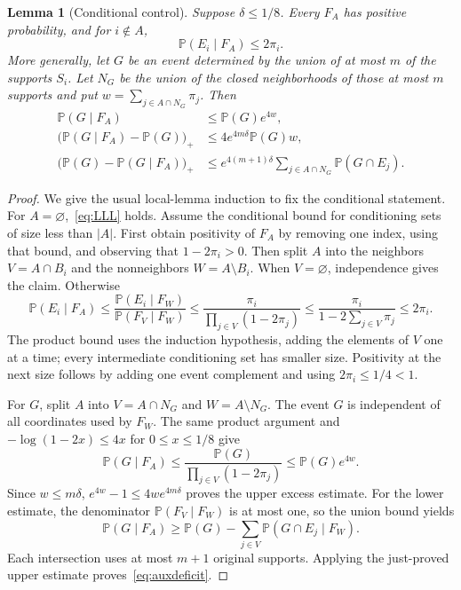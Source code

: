 \documentclass[11pt]{article}
\newtheorem{lemma}[theorem]{Lemma}
\theoremstyle{definition}\newtheorem{definition}[theorem]{Definition}
\theoremstyle{remark}\newtheorem{remark}[theorem]{Remark}
\newcommand{\PP}{\mathbb P}
\begin{document}
\begin{lemma}[Conditional control]\label{lem:conditional}
Suppose $\delta\le1/8$. Every $F_A$ has positive probability, and for
$i\notin A$,
\begin{equation}
 \PP(E_i\mid F_A)\le2\pi_i.\label{eq:LLL}
\end{equation}
More generally, let $G$ be an event determined by the union of at most $m$
of the supports $S_i$. Let $N_G$ be the union of the closed neighborhoods of those at most $m$
supports and put $w=\sum_{j\in A\cap N_G}\pi_j$. Then
\begin{align}
 \PP(G\mid F_A)&\le\PP(G)e^{4w},\label{eq:auxupper}\\
 \bigl(\PP(G\mid F_A)-\PP(G)\bigr)_+
       &\le4e^{4m\delta}\PP(G)w,\label{eq:auxexcess}\\
 \bigl(\PP(G)-\PP(G\mid F_A)\bigr)_+
       &\le e^{4(m+1)\delta}
           \sum_{j\in A\cap N_G}\PP(G\cap E_j).
           \label{eq:auxdeficit}
\end{align}
\end{lemma}
\begin{proof}
We give the usual local-lemma induction to fix the conditional statement.
For $A=\varnothing$,~\eqref{eq:LLL} holds. Assume the conditional bound
for conditioning sets of size less than $|A|$. First obtain positivity of
$F_A$ by removing one index, using that bound, and observing that
$1-2\pi_i>0$. Then split $A$ into the neighbors
$V=A\cap B_i$ and the nonneighbors $W=A\setminus B_i$.
When $V=\varnothing$, independence gives the claim. Otherwise
\[
 \PP(E_i\mid F_A)
 \le \frac{\PP(E_i\mid F_W)}{\PP(F_V\mid F_W)}
 \le\frac{\pi_i}{\prod_{j\in V}(1-2\pi_j)}
 \le\frac{\pi_i}{1-2\sum_{j\in V}\pi_j}
 \le2\pi_i.
\]
The product bound uses the induction hypothesis, adding the elements of
$V$ one at a time; every intermediate conditioning set has smaller size.
Positivity at the next size follows by adding one event complement and
using $2\pi_i\le1/4<1$.

For $G$, split $A$ into $V=A\cap N_G$ and $W=A\setminus N_G$.
The event $G$ is independent of all coordinates used by $F_W$. The same
product argument and $-\log(1-2x)\le4x$ for $0\le x\le1/8$ give
\[
 \PP(G\mid F_A)
 \le\frac{\PP(G)}{\prod_{j\in V}(1-2\pi_j)}
 \le\PP(G)e^{4w}.
\]
Since $w\le m\delta$, $e^{4w}-1\le4we^{4m\delta}$ proves the upper
excess estimate. For the lower estimate, the denominator
$\PP(F_V\mid F_W)$ is at most one, so the union bound yields
\[
 \PP(G\mid F_A)\ge
 \PP(G)-\sum_{j\in V}\PP(G\cap E_j\mid F_W).
\]
Each intersection uses at most $m+1$ original supports. Applying the
just-proved upper estimate proves~\eqref{eq:auxdeficit}.
\end{proof}
\end{document}
